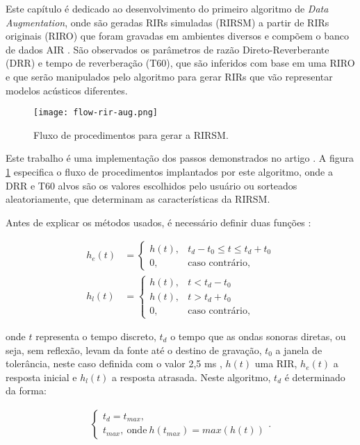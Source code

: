 Este capítulo é dedicado ao desenvolvimento do primeiro algoritmo de \textit{Data Augmentation}, onde são geradas RIRs simuladas (RIRSM)
a partir de RIRs originais (RIRO) que foram gravadas em ambientes diversos e compõem o banco de dados AIR \cite{AIR_Database}. 
São observados os parâmetros de razão Direto-Reverberante (DRR) e tempo de reverberação (T60), que são
inferidos com base em uma RIRO e que serão manipulados pelo algoritmo para gerar RIRs que vão representar modelos acústicos diferentes.

\begin{figure} [H]
    \centering
    \texttt{[image: flow-rir-aug.png]}
    \caption{Fluxo de procedimentos para gerar a RIRSM.}
    \label{fig:flow-rir-aug}
\end{figure}

Este trabalho é uma implementação dos passos demonstrados no artigo \cite{RIR_Data_Aug}. A figura \ref{fig:flow-rir-aug} especifica 
o fluxo de procedimentos implantados por este algoritmo, onde a DRR e T60 alvos são os valores escolhidos pelo usuário ou sorteados aleatoriamente,
que determinam as características da RIRSM. 

Antes de explicar os métodos usados, é necessário definir duas funções \cite{RIR_Data_Aug}:

\begin{align} 
    h_e(t) &= 
    \begin{cases} \label{eqn:rir-early}
        h(t), & t_d-t_0 \le t \le t_d+t_0 \\
        0, & \text{caso contrário,}
    \end{cases} \\
    h_l(t) &= 
    \begin{cases} \label{eqn:rir-late}
        h(t), & t < t_d - t_0 \\
        h(t), & t > t_d + t_0 \\
        0, & \text{caso contrário,}
    \end{cases}
\end{align}

\noindent
onde $t$ representa o tempo discreto, $t_d$ o tempo que as ondas sonoras diretas, ou seja, sem reflexão, levam da fonte até o destino de gravação,
$t_0$ a janela de tolerância, neste caso definida com o valor 2,5 ms \cite{RIR_Data_Aug}, 
$h(t)$ uma RIR, $h_e(t)$ a resposta inicial e $h_l(t)$ a resposta atrasada.
Neste algoritmo, $t_d$ é determinado da forma:

\begin{align} \label{eqn:t_d}
    \begin{cases}
        t_d = t_{max},\\
        t_{max}, \ \text{onde} \ h(t_{max}) = max(h(t))
    \end{cases}
    .
\end{align}


